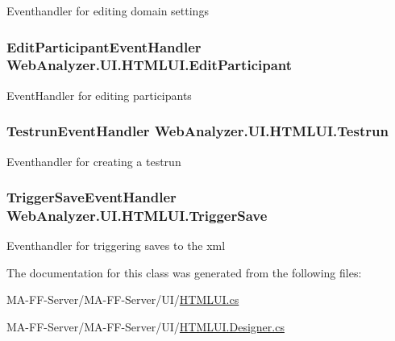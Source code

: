 Eventhandler for editing domain settings 

\hypertarget{class_web_analyzer_1_1_u_i_1_1_h_t_m_l_u_i_a41d7bba18de0e030779e1bc57de9d267}{}
\subsubsection[{Edit\+Participant}]{\setlength{\rightskip}{0pt plus 5cm}Edit\+Participant\+Event\+Handler Web\+Analyzer.\+U\+I.\+H\+T\+M\+L\+U\+I.\+Edit\+Participant}\label{class_web_analyzer_1_1_u_i_1_1_h_t_m_l_u_i_a41d7bba18de0e030779e1bc57de9d267}


Event\+Handler for editing participants 

\hypertarget{class_web_analyzer_1_1_u_i_1_1_h_t_m_l_u_i_adb77cf3b6fe81466fc13561570764024}{}
\subsubsection[{Testrun}]{\setlength{\rightskip}{0pt plus 5cm}Testrun\+Event\+Handler Web\+Analyzer.\+U\+I.\+H\+T\+M\+L\+U\+I.\+Testrun}\label{class_web_analyzer_1_1_u_i_1_1_h_t_m_l_u_i_adb77cf3b6fe81466fc13561570764024}


Eventhandler for creating a testrun 

\hypertarget{class_web_analyzer_1_1_u_i_1_1_h_t_m_l_u_i_a88837323ee334b87422f0d8cf1897952}{}
\subsubsection[{Trigger\+Save}]{\setlength{\rightskip}{0pt plus 5cm}Trigger\+Save\+Event\+Handler Web\+Analyzer.\+U\+I.\+H\+T\+M\+L\+U\+I.\+Trigger\+Save}\label{class_web_analyzer_1_1_u_i_1_1_h_t_m_l_u_i_a88837323ee334b87422f0d8cf1897952}


Eventhandler for triggering saves to the xml 



The documentation for this class was generated from the following files\+:\begin{DoxyCompactItemize}
\item 
M\+A-\/\+F\+F-\/\+Server/\+M\+A-\/\+F\+F-\/\+Server/\+U\+I/\hyperlink{_h_t_m_l_u_i_8cs}{H\+T\+M\+L\+U\+I.\+cs}\item 
M\+A-\/\+F\+F-\/\+Server/\+M\+A-\/\+F\+F-\/\+Server/\+U\+I/\hyperlink{_h_t_m_l_u_i_8_designer_8cs}{H\+T\+M\+L\+U\+I.\+Designer.\+cs}\end{DoxyCompactItemize}
